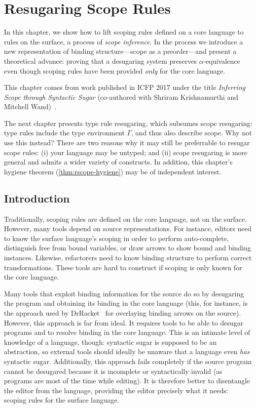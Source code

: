\chapter{Resugaring Scope Rules}\label{chap:resugar-scope}

In this chapter, we show how to lift scoping rules defined on a core
language to rules on the surface, a process of \emph{scope inference}.
In the process we introduce a new representation of binding
structure---scope as a preorder---and present a theoretical advance:
proving that a desugaring system preserves $\alpha$-equivalence even
though scoping rules have been provided \emph{only} for the core
language.

This chapter comes from work published in ICFP 2017 under the title
\emph{Inferring Scope through Syntactic Sugar} (co-authored with
Shriram Krishnamurthi and Mitchell Wand)~\cite{pombrio-scope}.
  
The next chapter presents type rule resugaring, which subsumes scope
resugaring: type rules include the type environment $\Gamma$, and thus
also describe scope. Why not use this instead? There
are two reasons why it may still be preferrable to resugar scope
rules: (i) your language may be untyped; and (ii) scope resugaring is
more general and admits a wider variety of constructs. In addition,
this chapter's hygiene theorem (\cref{thm:rscope-hygiene}) may be of
independent interest.

\section{Introduction}

Traditionally,
scoping rules are defined on the core language, not on the
surface. However, many tools depend on source representations. For
instance, editors need to know the surface language's scoping in order
to perform auto-complete, distinguish free from bound variables, or draw
arrows to show bound and binding instances. Likewise, refactorers need
to know binding structure to perform correct transformations.
These tools are hard to construct if scoping is only known
for the core language.

Many tools that exploit binding information for the source
do so by desugaring the program and obtaining its binding in the core
language (this, for instance, is the approach used by
DrRacket~\cite{drscheme} for overlaying binding arrows on the
source).
However, this approach is far from ideal. It requires tools to be able
to desugar programs and to resolve binding in the core
language. This is an intimate level of knowledge of a language, though:
syntactic sugar is supposed to be an abstraction, so external tools
should ideally be unaware that a language even \emph{has} syntactic
sugar. Additionally, this approach fails completely if the source
program cannot be desugared because it is incomplete or syntactically
invalid (as programs are most of the time while editing). It is
therefore better to disentangle the editor from the language,
providing the editor precisely what it needs: scoping rules for the
surface language.

